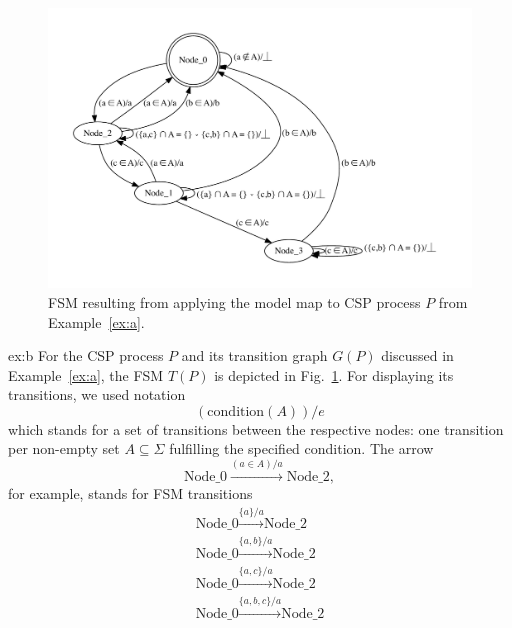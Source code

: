  \begin{figure}
 \begin{center}
\includegraphics[width=\textwidth]{fsm0.pdf}
\end{center}
\caption{FSM resulting from applying the model map to CSP process $P$ from Example~\ref{ex:a}.}
 \label{fig:fsm0}
 \end{figure}


\begin{example}{ex:b}
For the CSP process $P$ and its transition graph $G(P)$ discussed in Example~\ref{ex:a}, the FSM $T(P)$ is depicted in Fig.~\ref{fig:fsm0}.
For displaying its transitions, we used notation
$$
(\text{condition}(A)) / e
$$
which stands for a set of transitions between the respective nodes: one transition per non-empty set $A\subseteq \Sigma$ fulfilling the specified condition.
The arrow
$$
\text{Node\_0} \xrightarrow{(a\in A) / a} \text{Node\_2},
$$
for example, stands for FSM transitions
$$
\begin{array}{l}
\text{Node\_0} \xrightarrow{\{a\}/a} \text{Node\_2} \\
\text{Node\_0} \xrightarrow{\{a,b\}/a} \text{Node\_2} \\
\text{Node\_0} \xrightarrow{\{a,c\}/a} \text{Node\_2} \\
\text{Node\_0} \xrightarrow{\{a,b,c\}/a} \text{Node\_2} \\
\end{array}
$$
\end{example}


